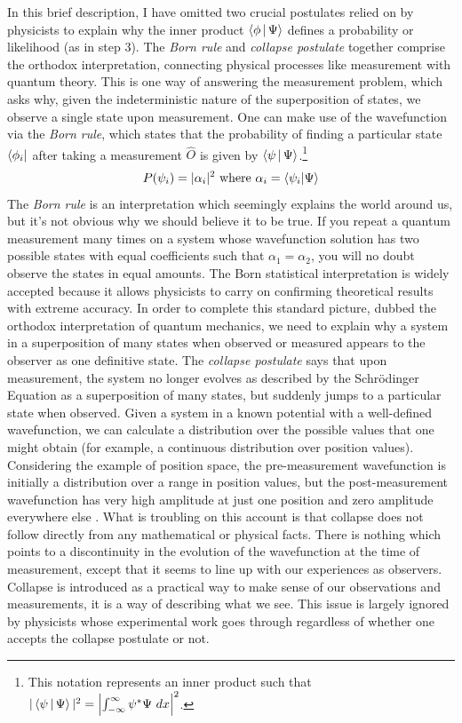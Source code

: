 \documentclass{article}
\begin{document}
In this brief description, I have omitted two crucial postulates relied on by physicists to explain why the inner product $\Braket{\phi|\Psi}$ defines a probability or likelihood (as in step 3).
The \emph{Born rule} and \emph{collapse postulate} together comprise the orthodox interpretation, connecting physical processes like measurement with quantum theory.
This is one way of answering the measurement problem, which asks why, given the indeterministic nature of the superposition of states, we observe a single state upon measurement.
One can make use of the wavefunction via the \emph{Born rule}, which states that the probability of finding a particular state $\bra{\phi_i}$ after taking a measurement $\hat{O}$ is given by $\Braket{\psi|\Psi}$.\footnote{This notation represents an inner product such that $|\Braket{\psi|\Psi}|^2 =\left| \int_{-\infty}^{\infty} \psi^* \Psi ~dx\right|^2$.}
\begin{gather}
	P(\psi_i) = |\alpha_i|^2 \text{  where  } \alpha_i= \braket{\psi_i | \Psi}
\end{gather}
The \emph{Born rule} is an interpretation which seemingly explains the world around us, but it's not obvious why we should believe it to be true.
If you repeat a quantum measurement many times on a system whose wavefunction solution has two possible states with equal coefficients such that $\alpha_1 = \alpha_2$, you will no doubt observe the states in equal amounts.
The Born statistical interpretation is widely accepted because it allows physicists to carry on confirming theoretical results with extreme accuracy.
In order to complete this standard picture, dubbed the orthodox interpretation of quantum mechanics, we need to explain why a system in a superposition of many states when observed or measured appears to the observer as one definitive state.
The \emph{collapse postulate} says that upon measurement, the system no longer evolves as described by the Schrödinger Equation as a superposition of many states, but suddenly jumps to a particular state when observed.
Given a system in a known potential with a well-defined wavefunction, we can calculate a distribution over the possible values that one might obtain (for example, a continuous distribution over position values). 
Considering the example of position space, the pre-measurement wavefunction is initially a distribution over a range in position values, but the post-measurement wavefunction has very high amplitude at just one position and zero amplitude everywhere else \parencite[6]{griffithsIntroductionQuantumMechanics2018}. 
What is troubling on this account is that collapse does not follow directly from any mathematical or physical facts.
There is nothing which points to a discontinuity in the evolution of the wavefunction at the time of measurement, except that it seems to line up with our experiences as observers.
Collapse is introduced as a practical way to make sense of our observations and measurements, it is a way of describing what we see. 
This issue is largely ignored by physicists whose experimental work goes through regardless of whether one accepts the collapse postulate or not.
\end{document}
